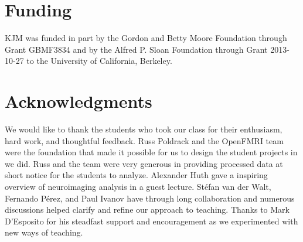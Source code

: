 \documentclass[utf8]{frontiersSCNS} %
\begin{document}



\section*{Funding}

KJM was funded in part by the Gordon and Betty Moore Foundation through Grant
GBMF3834 and by the Alfred P. Sloan Foundation through Grant 2013-10-27 to the
University of California, Berkeley.

\section*{Acknowledgments}
We would like to thank the students who took our class for their enthusiasm,
hard work, and thoughtful feedback.  Russ Poldrack and the OpenFMRI team
were the foundation that made it possible for us to design the student
projects in we did. Russ and the team were very generous in providing
processed data at short notice for the students to analyze.  Alexander Huth
gave a inspiring overview of neuroimaging analysis in a guest lecture.
St{\'e}fan van der Walt, Fernando P{\'e}rez, and Paul Ivanov have through long
collaboration and numerous discussions helped clarify and refine our approach
to teaching.  Thanks to Mark D'Esposito for his steadfast support and
encouragement as we experimented with new ways of teaching.



\end{document}
